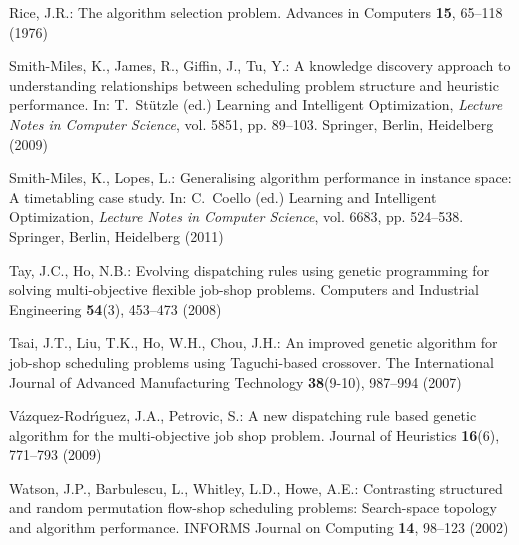 \documentclass[graybox]{svmult}
\begin{document}
\begin{thebibliography}{10}
    Rice, J.R.: The algorithm selection problem.
    \newblock Advances in Computers \textbf{15}, 65--118 (1976)
    
    Smith-Miles, K., James, R., Giffin, J., Tu, Y.: A knowledge discovery 
    approach
    to understanding relationships between scheduling problem structure and
    heuristic performance.
    \newblock In: T.~Stützle (ed.) Learning and Intelligent Optimization,
    \emph{Lecture Notes in Computer Science}, vol. 5851, pp. 89--103. Springer,
    Berlin, Heidelberg (2009)
    
    Smith-Miles, K., Lopes, L.: Generalising algorithm performance in instance
    space: A timetabling case study.
    \newblock In: C.~Coello (ed.) Learning and Intelligent Optimization,
    \emph{Lecture Notes in Computer Science}, vol. 6683, pp. 524--538. Springer,
    Berlin, Heidelberg (2011)
    
    Tay, J.C., Ho, N.B.: Evolving dispatching rules using genetic programming 
    for
    solving multi-objective flexible job-shop problems.
    \newblock Computers and Industrial Engineering \textbf{54}(3), 453--473 
    (2008)
    
    Tsai, J.T., Liu, T.K., Ho, W.H., Chou, J.H.: {An improved genetic algorithm 
    for
        job-shop scheduling problems using Taguchi-based crossover}.
    \newblock The International Journal of Advanced Manufacturing Technology
    \textbf{38}(9-10), 987--994 (2007)
    
    V\'{a}zquez-Rodr\'{\i}guez, J.A., Petrovic, S.: {A new dispatching rule 
    based
        genetic algorithm for the multi-objective job shop problem}.
    \newblock Journal of Heuristics \textbf{16}(6), 771--793 (2009)
    
    Watson, J.P., Barbulescu, L., Whitley, L.D., Howe, A.E.: Contrasting 
    structured
    and random permutation flow-shop scheduling problems: Search-space topology
    and algorithm performance.
    \newblock INFORMS Journal on Computing \textbf{14}, 98--123 (2002)
    
\end{thebibliography}
\end{document}
